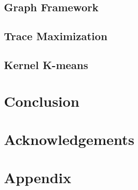 \subsection{Graph Framework}
\label{sec:gfx}

\subsection{Trace Maximization}
\label{sec:trmax}

\subsection{Kernel K-means}
\label{sec:kkmean}

\section{Conclusion}
\label{sec:conclusion}


\section*{Acknowledgements}




\section*{Appendix}



